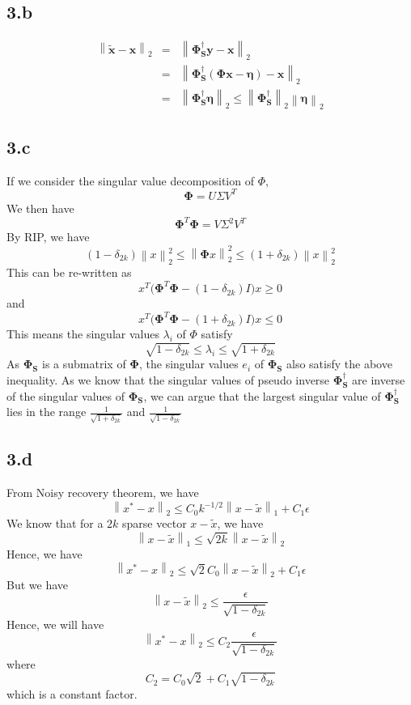 \documentclass[12pt]{article}
\newcommand{\norm}[1]{\left\lVert #1 \right\rVert}
\begin{document}
\subsection*{3.b}
\begin{eqnarray*}
\norm{\boldsymbol{\tilde{x}} - \boldsymbol{x}}_2 &=& \norm{\boldsymbol{\Phi_S^\dagger y - x}}_2\\
&=&\norm{\boldsymbol{\Phi_S^\dagger}(\boldsymbol{\Phi x - \eta}) - \boldsymbol{x}}_2\\
&=& \norm{\boldsymbol{\Phi_S^\dagger \eta}}_2 \leq \norm{\boldsymbol{\Phi_S^\dagger}}_2 \norm{\boldsymbol{\eta}}_2
\end{eqnarray*}
\subsection*{3.c}
If we consider the singular value decomposition of $\Phi$, 
$$\boldsymbol{\Phi} = U \Sigma V^T$$
We then have
$$\boldsymbol{\Phi}^T \boldsymbol{\Phi} = V \Sigma^2 V^T$$
By RIP, we have
$$(1 - \delta_{2k}) \norm{x}_2^2 \leq \norm{\boldsymbol{\Phi} x}_2^2 \leq (1 + \delta_{2k})\norm{x}_2^2$$
This can be re-written as 
$$x^T \bigg(\boldsymbol{\Phi}^T\boldsymbol{\Phi} - (1-\delta_{2k})I\bigg)x \geq 0$$ and
$$x^T \bigg(\boldsymbol{\Phi}^T\boldsymbol{\Phi} - (1+\delta_{2k})I\bigg)x \leq 0$$
This means the singular values $\lambda_i$ of $\Phi$ satisfy
$$\sqrt{1 - \delta_{2k}} \leq \lambda_i \leq \sqrt{1 + \delta_{2k}}$$
As $\boldsymbol{\Phi_S}$ is a submatrix of $\boldsymbol{\Phi}$, the singular values $e_i$ of $\boldsymbol{\Phi_S}$ also satisfy the above inequality.
As we know that the singular values of pseudo inverse $\boldsymbol{\Phi_S^\dagger}$ are inverse of the singular values of $\boldsymbol{\Phi_S}$, we can argue that the largest singular value of $\boldsymbol{\Phi_S^\dagger}$ lies in the range $\frac{1}{\sqrt{1 + \delta_{2k}}}$ and $\frac{1}{\sqrt{1 - \delta_{2k}}}$
\subsection*{3.d}
From Noisy recovery theorem, we have
$$\norm{x^* - x}_2 \leq C_0 k^{-1/2} \norm{x - \tilde{x}}_1 + C_1 \epsilon$$
We know that for a $2k$ sparse vector $x - \tilde{x}$, we have
$$\norm{x - \tilde{x}}_1 \leq \sqrt{2k} \norm{x - \tilde{x}}_2$$
Hence, we have
$$\norm{x^* - x}_2 \leq \sqrt{2} C_0 \norm{x - \tilde{x}}_2 + C_1 \epsilon$$
But we have
$$\norm{x - \tilde{x}}_2 \leq \frac{\epsilon}{\sqrt{1 - \delta_{2k}}}$$
Hence, we will have
$$\norm{x^* - x}_2 \leq C_2 \frac{\epsilon}{\sqrt{1 - \delta_{2k}}}$$
where 
$$C_2 = C_0 \sqrt{2}+ C_1 \sqrt{1 - \delta_{2k}}$$
which is a constant factor.
\end{document}
